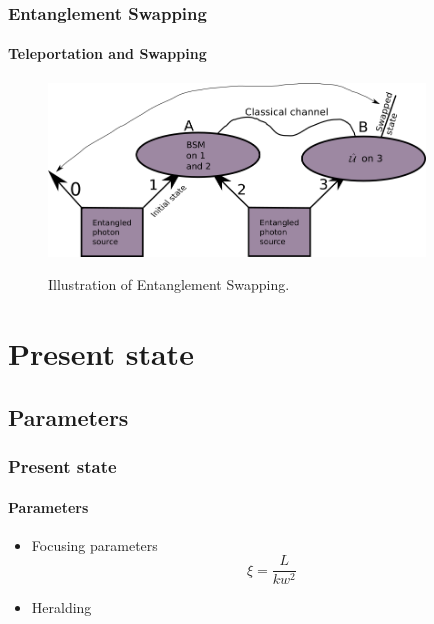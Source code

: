 \documentclass[serif,8pt]{beamer}
\begin{document}
{{%


\addtocounter{framenumber}{-1}
\begin{frame}[t]
    \frametitle{Entanglement Swapping}
    \framesubtitle{Teleportation and Swapping}
\begin{figure}[]
      \centering
      \caption{Illustration of Entanglement Swapping.}
      \includegraphics[width=10cm]{EntanglementSwapping.png}
	\label{fig:Swap}
    \end{figure}
\end{frame}

\section{Present state}

\subsection{Parameters}
\begin{frame}[t]
	\frametitle{Present state}
	\framesubtitle{Parameters}
		\begin{itemize}
			\item Focusing parameters \cite{bennik}
					\begin{equation}
							\xi = \frac{L}{k w^2}
						\label{eq:Focusing parameter}
					\end{equation}
			\item Heralding
		\end{itemize}
\end{frame}

}}
\end{document}
